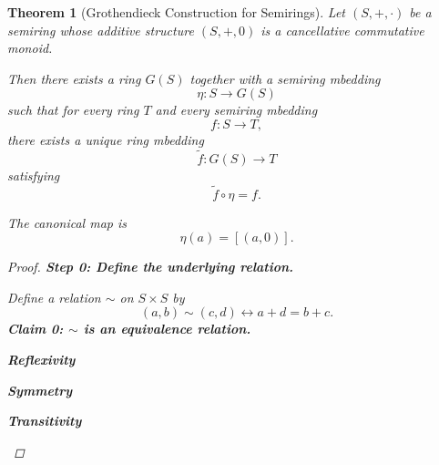 \documentclass[10pt,a4paper]{book}
\newtheorem{theorem}{Theorem}[section]
\begin{document}
\begin{theorem}[Grothendieck Construction for Semirings]
    Let $(S,+, \cdot )$ be a semiring whose additive structure $(S,+,0)$ is a cancellative commutative monoid.

    Then there exists a ring $G(S)$ together with a semiring mbedding
    \[
        \eta : S \longrightarrow G(S)
    \]
    such that for every ring $T$ and every semiring mbedding
    \[
        f : S \to T,
    \]
    there exists a unique ring mbedding
    \[
        \tilde{f} : G(S) \to T
    \]
    satisfying
    \[
        \tilde{f} \circ \eta = f.
    \]

    The canonical map is
    \[
        \eta(a) = [(a,0)].
    \]

    \begin{proof}

        \textbf{Step 0: Define the underlying relation.}

        Define a relation $\sim$ on $S \times S$ by
        \[
            (a,b) \sim (c,d) \leftrightarrow a + d = b + c.
        \]
        \textbf{Claim 0: $\sim$ is an equivalence relation.}

        \textbf{Reflexivity}
        \begin{fitchproof}[arrayenv=tabular]

            \open
            \close

        \end{fitchproof}

        \textbf{Symmetry}
        \begin{fitchproof}[arrayenv=tabular]

            \open
            \close

        \end{fitchproof}

        \textbf{Transitivity}
        \begin{fitchproof}[arrayenv=tabular]

            \open

             
             


\end{fitchproof}
\end{proof}
\end{theorem}
\end{document}
